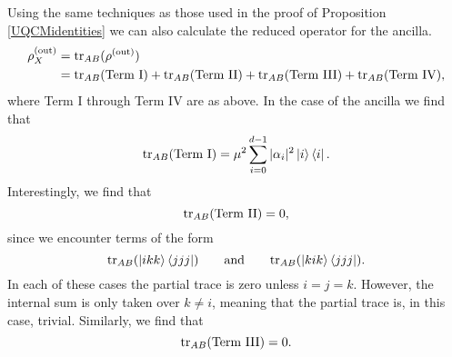 \documentclass[reqno]{amsart}
\numberwithin{lemma}{section}
\numberwithin{proposition}{section}
\newcommand{\out}{\textnormal{out}}
\newcommand{\tr}{\textnormal{tr}}
\begin{document}
{\begin{remark}
Using the same techniques as those used in the proof of Proposition \ref{UQCMidentities} we can also calculate the reduced operator for the ancilla.
\begin{align*}
\rho_{X}^{(\out)} &= \tr_{AB}(\rho^{(\out)})\\
&= \tr_{AB}(\text{Term I}) + \tr_{AB}(\text{Term II}) + \tr_{AB}(\text{Term III}) + \tr_{AB}(\text{Term IV}),
\end{align*}
where Term I through Term IV are as above. In the case of the ancilla we find that
\begin{align*}
\tr_{AB}(\text{Term I}) = \mu^{2} \sum_{i=0}^{d-1} \vert \alpha_{i} \vert^{2} \ket{i} \bra{i}.
\end{align*}
Interestingly, we find that
\begin{equation*}
\tr_{AB}(\text{Term II}) = 0,
\end{equation*}
since we encounter terms of the form 
\begin{equation*}
\tr_{AB}( \ket{ikk} \bra{jjj}) \qquad \text{and} \qquad \tr_{AB}( \ket{kik}\bra{jjj}).
\end{equation*}
In each of these cases the partial trace is zero unless $i = j = k$. However, the internal sum is only taken over $k \neq i$, meaning that the partial trace is, in this case, trivial. Similarly, we find that
\begin{equation*}
\tr_{AB}(\text{Term III}) = 0.
\end{equation*}


\end{remark}}
\end{document}
